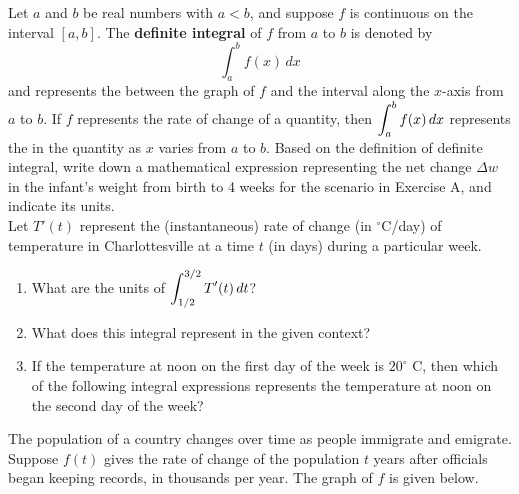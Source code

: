 \documentclass[10pt]{article}
\begin{document}
\newpage
{}
{
Let $a$ and $b$ be real numbers with $a<b$, and suppose $f$ is continuous on the interval $[a,b]$. The {\bf definite integral} of $f$ from $a$ to $b$ is denoted by \[\int_a^b f(x)\,dx\] and represents the  between the graph of $f$ and the interval along the $x$-axis from $a$ to $b$. If $f$ represents the rate of change of a quantity, then $\displaystyle \int_a^b f(x)\,dx$ represents the  in the quantity as $x$ varies from $a$ to $b$.
}
\example Based on the definition of definite integral, write down a mathematical expression representing the net change $\Delta w$ in the infant's weight from birth to 4 weeks for the scenario in Exercise A, and indicate its units.
\\
\exercise{} Let $T'(t)$ represent the (instantaneous) rate of change (in $^{\circ}$C/day) of temperature in Charlottesville at a time $t$ (in days) during a particular week. 

\begin{enumerate}
\item[(a)] What are the units of $\displaystyle \int_{1/2}^{3/2} T'(t)\,dt$? 

\item[(b)] What does this integral represent in the given context?
    \vfill



\item[(c)] \pe If the temperature at noon on the first day of the week is $20^{\circ}$ C, then which of the following integral expressions represents the temperature at noon on the second day of the week?
\end{enumerate}

\newpage
{\exercise} The population of a country changes over time as people immigrate and emigrate. Suppose $f(t)$ gives the rate of change of the population $t$ years after officials began keeping records, in thousands per year. The graph of $f$ is given below.\\
\end{document}
